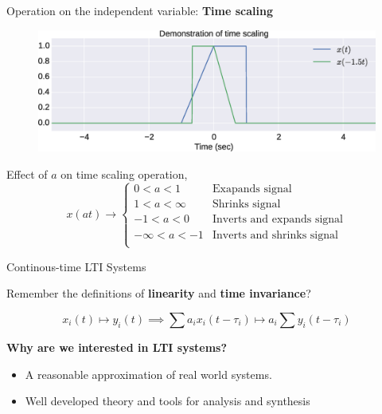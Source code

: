\documentclass{beamer}
\begin{document}
\begin{frame}{Operation on the independent variable: \textbf{Time scaling}}

\begin{figure}
\includegraphics[width=\textwidth]{img/tscale3.eps}
\end{figure}

Effect of $a$ on time scaling operation,
\[
x(at) \longrightarrow \begin{cases}
0 < a < 1 & \text{Exapands signal} \\
1 < a < \infty & \text{Shrinks signal} \\
-1 < a < 0 & \text{Inverts and expands signal} \\
-\infty < a < -1 & \text{Inverts and shrinks signal} \\
\end{cases}
\]
\end{frame}

\begin{frame}{Continous-time LTI Systems}

Remember the definitions of \textbf{linearity} and \textbf{time invariance}?

\[ x_i(t) \mapsto y_i(t) \implies \sum a_ix_i(t - \tau_i) \mapsto a_i \sum y_i(t - \tau_i) \]

\vspace{10mm}

\textbf{Why are we interested in LTI systems?}
\begin{itemize}
\item A reasonable approximation of real world systems.
\item Well developed theory and tools for analysis and synthesis
\end{itemize}

\end{frame}
\end{document}
